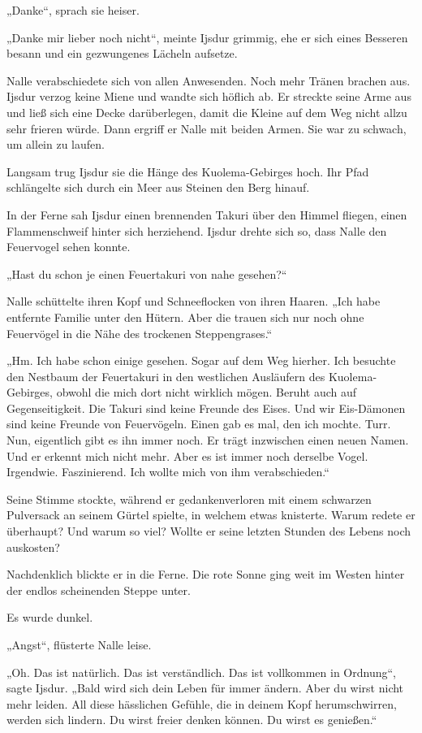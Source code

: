 „Danke“, sprach sie heiser.

„Danke mir lieber noch nicht“, meinte Ijsdur grimmig, ehe er sich eines Besseren besann und ein gezwungenes Lächeln aufsetze.

Nalle verabschiedete sich von allen Anwesenden. Noch mehr Tränen brachen aus. Ijsdur verzog keine Miene und wandte sich höflich ab. Er streckte seine Arme aus und ließ sich eine Decke darüberlegen, damit die Kleine auf dem Weg nicht allzu sehr frieren würde. Dann ergriff er Nalle mit beiden Armen. Sie war zu schwach, um allein zu laufen.

Langsam trug Ijsdur sie die Hänge des Kuolema-Gebirges hoch. Ihr Pfad schlängelte sich durch ein Meer aus Steinen den Berg hinauf.

In der Ferne sah Ijsdur einen brennenden Takuri über den Himmel fliegen, einen Flammenschweif hinter sich herziehend. Ijsdur drehte sich so, dass Nalle den Feuervogel sehen konnte.

„Hast du schon je einen Feuertakuri von nahe gesehen?“

Nalle schüttelte ihren Kopf und Schneeflocken von ihren Haaren. „Ich habe entfernte Familie unter den Hütern. Aber die trauen sich nur noch ohne Feuervögel in die Nähe des trockenen Steppengrases.“

„Hm. Ich habe schon einige gesehen. Sogar auf dem Weg hierher. Ich besuchte den Nestbaum der Feuertakuri in den westlichen Ausläufern des Kuolema-Gebirges, obwohl die mich dort nicht wirklich mögen. Beruht auch auf Gegenseitigkeit. Die Takuri sind keine Freunde des Eises. Und wir Eis-Dämonen sind keine Freunde von Feuervögeln. Einen gab es mal, den ich mochte. Turr. Nun, eigentlich gibt es ihn immer noch. Er trägt inzwischen einen neuen Namen. Und er erkennt mich nicht mehr. Aber es ist immer noch derselbe Vogel. Irgendwie. Faszinierend. Ich wollte mich von ihm verabschieden.“

Seine Stimme stockte, während er gedankenverloren mit einem schwarzen Pulversack an seinem Gürtel spielte, in welchem etwas knisterte. Warum redete er überhaupt? Und warum so viel? Wollte er seine letzten Stunden des Lebens noch auskosten?

Nachdenklich blickte er in die Ferne. Die rote Sonne ging weit im Westen hinter der endlos scheinenden Steppe unter.

Es wurde dunkel.

„Angst“, flüsterte Nalle leise.

„Oh. Das ist natürlich. Das ist verständlich. Das ist vollkommen in Ordnung“, sagte Ijsdur. „Bald wird sich dein Leben für immer ändern. Aber du wirst nicht mehr leiden. All diese hässlichen Gefühle, die in deinem Kopf herumschwirren, werden sich lindern. Du wirst freier denken können. Du wirst es genießen.“

